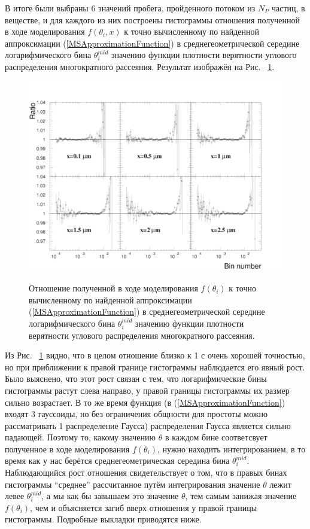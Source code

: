 \documentclass[a4paper,12pt]{article}
\begin{document}
\begin{large}
 	В итоге были выбраны 6 значений пробега, пройденного потоком из $N_P$ частиц, в веществе, и для каждого из них построены гистограммы отношения полученной в ходе моделирования $f(\theta_i,x)$ к точно вычисленному по найденной аппроксимации (\ref{MSApproximationFunction}) в среднегеометрической середине логарифмического бина $\theta^{mid}_i$ значению функции плотности верятности углового распределения многократного рассеяния.
 	Результат изображён на Рис. ~\ref{fig:MSRatioHistogramWithoutCorrection}.
 	
\begin{figure}[ht]
{
   \includegraphics[width=0.99\linewidth]{images/ratioms_without_correction.pdf}
}
\caption{Отношение полученной в ходе моделирования $f(\theta_i)$ к точно вычисленному по найденной аппроксимации (\ref{MSApproximationFunction}) в среднегеометрической середине логарифмического бина $\theta^{mid}_i$ значению функции плотности верятности углового распределения многократного рассеяния.}
\label{fig:MSRatioHistogramWithoutCorrection}
\end{figure}

	Из Рис. ~\ref{fig:MSRatioHistogramWithoutCorrection} видно, что в целом отношение близко к 1 с очень хорошей точностью, но при приближении к правой границе гистограммы наблюдается его явный рост.
	Было выяснено, что этот рост связан с тем, что логарифмические бины гистограммы растут слева направо, у правой границы гистограммы их размер сильно возрастает.
	В то же время функция (в (\ref{MSApproximationFunction}) входят 3 гауссоиды, но без ограничения общности для простоты можно рассматривать 1 распределение Гаусса) распределения Гаусса является сильно падающей.
	Поэтому то, какому значению $\theta$ в каждом бине соответсвует полученное в ходе моделирования $f(\theta_i)$, нужно находить интегрированием, в то время как у нас берётся среднегеометрическая середина бина $\theta^{mid}_i$.
	Наблюдающийся рост отношения свидетельствует о том, что в правых бинах гистограммы ``среднее'' рассчитанное путём интегрирования значение $\theta$ лежит левее $\theta^{mid}_i$, а мы как бы завышаем это значение $\theta$, тем самым занижая значение $f(\theta_i)$, чем и объясняется загиб вверх отношения у правой границы гистограммы. Подробные выкладки приводятся ниже.
  

\end{large}
\end{document}
